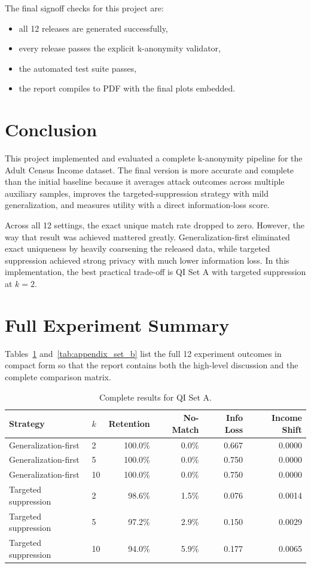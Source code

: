 \documentclass[11pt]{article}
\begin{document}
The final signoff checks for this project are:
\begin{itemize}[leftmargin=*]
    \item all 12 releases are generated successfully,
    \item every release passes the explicit k-anonymity validator,
    \item the automated test suite passes,
    \item the report compiles to PDF with the final plots embedded.
\end{itemize}

\section{Conclusion}
This project implemented and evaluated a complete k-anonymity pipeline for the Adult Census Income dataset. The final version is more accurate and complete than the initial baseline because it averages attack outcomes across multiple auxiliary samples, improves the targeted-suppression strategy with mild generalization, and measures utility with a direct information-loss score.

Across all 12 settings, the exact unique match rate dropped to zero. However, the way that result was achieved mattered greatly. Generalization-first eliminated exact uniqueness by heavily coarsening the released data, while targeted suppression achieved strong privacy with much lower information loss. In this implementation, the best practical trade-off is QI Set A with targeted suppression at $k=2$.

\appendix
\section{Full Experiment Summary}
Tables~\ref{tab:appendix_set_a} and~\ref{tab:appendix_set_b} list the full 12 experiment outcomes in compact form so that the report contains both the high-level discussion and the complete comparison matrix.

\begin{table}[H]
\centering
\scriptsize
\begin{tabular}{llrrrr}
\toprule
\textbf{Strategy} & \textbf{$k$} & \textbf{Retention} & \textbf{No-Match} & \textbf{Info Loss} & \textbf{Income Shift} \\
\midrule
Generalization-first & 2 & 100.0\% & 0.0\% & 0.667 & 0.0000 \\
Generalization-first & 5 & 100.0\% & 0.0\% & 0.750 & 0.0000 \\
Generalization-first & 10 & 100.0\% & 0.0\% & 0.750 & 0.0000 \\
Targeted suppression & 2 & 98.6\% & 1.5\% & 0.076 & 0.0014 \\
Targeted suppression & 5 & 97.2\% & 2.9\% & 0.150 & 0.0029 \\
Targeted suppression & 10 & 94.0\% & 5.9\% & 0.177 & 0.0065 \\
\bottomrule
\end{tabular}
\caption{Complete results for QI Set A.}
\label{tab:appendix_set_a}
\end{table}
\end{document}

